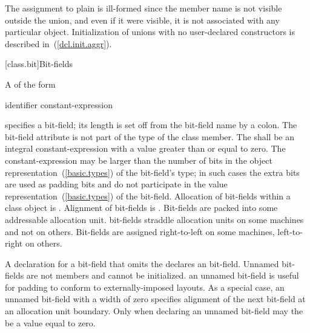 The assignment to plain  is ill-formed since the member name
is not visible outside the union, and even if it were visible, it is not
associated with any particular object.
\exitexample
\enternote
Initialization of unions with no user-declared constructors is described
in~(\ref{dcl.init.aggr}).
\exitnote

[class.bit]{Bit-fields}%

\pnum
A  of the form

\begin{ncbnftab}
identifier\opt \terminal{:} constant-expression
\end{ncbnftab}

%
%
specifies a bit-field;
its length is set off from the bit-field name by a colon. The bit-field
attribute is not part of the type of the class member. The
 shall be an integral constant-expression
with a value greater than or equal to zero. The constant-expression may
be larger than the number of bits in the object
representation~(\ref{basic.types}) of the bit-field's type; in such
cases the extra bits are used as padding bits and do not participate in
the value representation~(\ref{basic.types}) of the bit-field.
%
Allocation of bit-fields within a class object is
.
%
Alignment of bit-fields is .
%
Bit-fields are packed into some addressable allocation unit.
\enternote
bit-fields straddle allocation units on some machines and not on others.
Bit-fields are assigned right-to-left on some machines, left-to-right on
others.
\exitnote

\pnum
{}%
A declaration for a bit-field that omits the 
declares an  bit-field. Unnamed bit-fields are not
members and cannot be initialized.
\enternote
an unnamed bit-field is useful for padding to conform to
externally-imposed layouts.
\exitnote
{}%
%
As a special case, an unnamed bit-field with a width of zero specifies
alignment of the next bit-field at an allocation unit boundary. Only
when declaring an unnamed bit-field may the
 be a value equal to zero.

